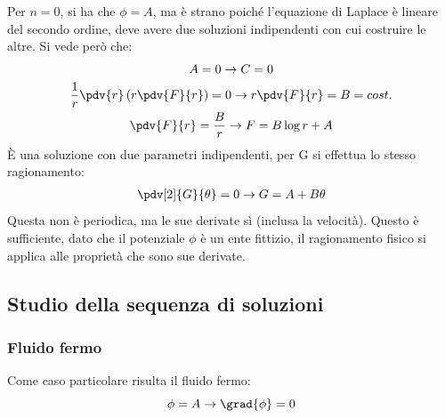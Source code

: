 Per $n = 0$, si ha che $\phi = A$, ma è strano poiché l'equazione di Laplace è lineare del secondo ordine, deve avere due soluzioni indipendenti con cui costruire le altre.
Si vede però che:
%
	\begin{equation*}
		\begin{gathered}
			A = 0 \rightarrow C = 0\\
			\frac{1}{r} \pdv{r} \left( r \pdv{F}{r} \right) = 0 \rightarrow r \pdv{F}{r} = B = cost.\\
			\pdv{F}{r} = \frac{B}{r} \rightarrow F = B \log{r} + A
		\end{gathered}
	\end{equation*}
%
È una soluzione con due parametri indipendenti, per G si effettua lo stesso ragionamento:
%
	\begin{equation*}
		\begin{gathered}
			\pdv[2]{G}{\theta} = 0 \rightarrow G = A + B \theta
		\end{gathered}
	\end{equation*}
%
Questa non è periodica, ma le sue derivate sì (inclusa la velocità).
Questo è sufficiente, dato che il potenziale $\phi$ è un ente fittizio, il ragionamento fisico si applica alle proprietà che sono sue derivate.

\subsection{Studio della sequenza di soluzioni}
\subsubsection{Fluido fermo}
Come caso particolare risulta il fluido fermo:
%
	\begin{equation*}
		\phi = A \rightarrow \grad{\phi} = 0
	\end{equation*}
%

